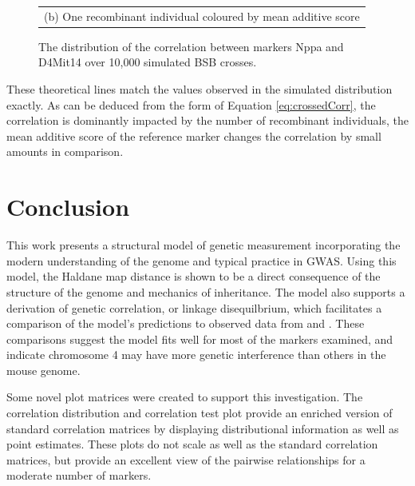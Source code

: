 \documentclass[sts]{imsart}
\begin{document}
\begin{figure}[htp]
\begin{center}
\begin{tabular}{c}
      {\footnotesize (b) One recombinant individual coloured by mean additive score}
    \end{tabular}
  \end{center}
  \caption{The distribution of the correlation between markers Nppa and D4Mit14 over 10,000 simulated BSB crosses.}
  \label{fig:bardetail}
\end{figure}
These theoretical lines match the values observed in the simulated distribution exactly. As can be deduced from the form of Equation \ref{eq:crossedCorr}, the correlation is dominantly impacted by the number of recombinant individuals, the mean additive score of the reference marker changes the correlation by small amounts in comparison.


\section{Conclusion} \label{sec:conclusion}

This work presents a structural model of genetic measurement incorporating the modern understanding of the genome and typical practice in GWAS. Using this model, the Haldane map distance is shown to be a direct consequence of the structure of the genome and mechanics of inheritance. The model also supports a derivation of genetic correlation, or linkage disequilbrium, which facilitates a comparison of the model's predictions to observed data from \cite{roweetal1994jaxbsb} and \cite{welchetal1996uclabsb}. These comparisons suggest the model fits well for most of the markers examined, and indicate chromosome 4 may have more genetic interference than others in the mouse genome.

Some novel plot matrices were created to support this investigation. The correlation distribution and correlation test plot provide an enriched version of standard correlation matrices by displaying distributional information as well as point estimates. These plots do not scale as well as the standard correlation matrices, but provide an excellent view of the pairwise relationships for a moderate number of markers.
\end{document}
